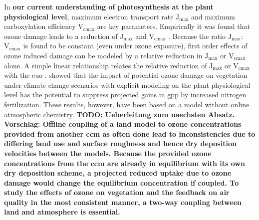 In \textbf{our current understanding of photosynthesis at the plant physiological level}, maximum electron transport rate $\mathrm{J_{max}}$ and maximum carboxylation efficiency $\mathrm{V_{cmax}}$ are key parameters. Empirically it was found that ozone damage leads to a reduction of $\mathrm{J_{max}}$ and $\mathrm{V_{cmax}}$ \parencite{EJA:Emberson2018}. Because the ratio $\mathrm{J_{max}}$:$\mathrm{V_{cmax}}$ is found to be constant (even under ozone exposure), first order effects of ozone induced damage can be modeled by a relative reduction in $\mathrm{J_{max}}$ or $\mathrm{V_{cmax}}$ alone. A simple linear relationship relates the relative reduction of $\mathrm{J_{max}}$ or $\mathrm{V_{cmax}}$ with the \gls{cuo} \parencites{BGS:Franz2017}{BGS:Franz2018}. \textcite{BGSD:Franz2020} showed that the impact of potential ozone damage on vegetation under climate change scenarios with explicit modeling on the plant physiological level has the potential to suppress projected gains in \gls{gpp} by increased nitrogen fertilization. These results, however, have been based on a model without online atmospheric chemistry. \textbf{\color{red}TODO: Ueberleitung zum naechsten Absatz. \color{blue}Vorschlag: Offline coupling of a land model to ozone concentrations provided from another \gls{ccm} as often done lead to inconsistencies due to differing land use and surface roughness and hence dry deposition velocities between the models. Because the provided ozone concentrations from the \gls{ccm} are already in equilibrium with its own dry deposition scheme, a projected reduced uptake due to ozone damage would change the equilibrium concentration if coupled. To study the effects of ozone on vegetation and the feedback on air quality in the most consistent manner, a two-way coupling between land and atmosphere is essential.}\\


